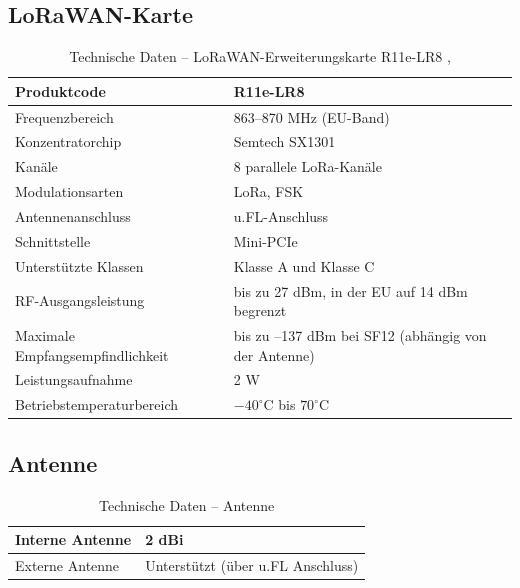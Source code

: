 	\subsection{LoRaWAN-Karte}
		\begin{table}[H]
			\centering
			\begin{tabular}{| l | l |}
				\hline
				Produktcode & R11e-LR8 \\
				\hline
				Frequenzbereich & 863--870 MHz (EU-Band) \\
				\hline
				Konzentratorchip & Semtech SX1301 \\
				\hline
				Kanäle & 8 parallele LoRa-Kanäle \\
				\hline
				Modulationsarten & LoRa, FSK \\
				\hline
				Antennenanschluss & u.FL-Anschluss \\
				\hline
				Schnittstelle & Mini-PCIe \\
				\hline
				Unterstützte Klassen & Klasse A und Klasse C \\
				\hline
				RF-Ausgangsleistung & bis zu 27 dBm, in der EU auf 14 dBm begrenzt \\
				\hline
				Maximale Empfangsempfindlichkeit & bis zu –137 dBm bei SF12 (abhängig von der Antenne) \\
				\hline
				Leistungsaufnahme & 2 W \\
				\hline
				Betriebstemperaturbereich & \(-40^\circ\mathrm{C}\) bis \(70^\circ\mathrm{C}\) \\
				\hline
			\end{tabular}
			\caption{Technische Daten – LoRaWAN-Erweiterungskarte R11e-LR8 \cite{mikrotik:2020}, \cite{mikrotik:2024}}
		\end{table}
		
		
		
	\subsection{Antenne}
		\begin{table}[H]
			\centering
			\begin{tabular}{| l | l |}
				\hline
				Interne Antenne & 2 dBi  \\
				\hline
				Externe Antenne & Unterstützt (über u.FL Anschluss) \\
				\hline
			\end{tabular}
			\caption{Technische Daten – Antenne \cite{mikrotik:2020}}
		\end{table}
		
